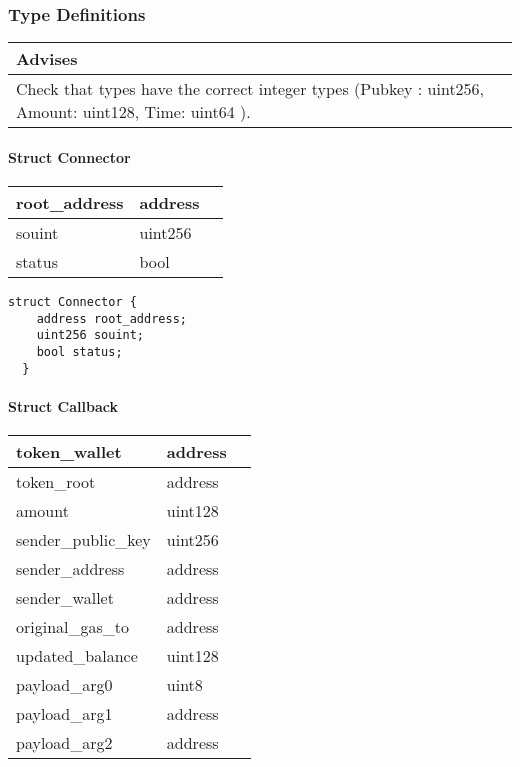 \subsubsection{Type Definitions}


\ifsoldraft
\noindent\begin{tabular}{|p{12cm}|}\hline
\rowcolor{green}Advises
\\\hline
Check that types have the correct integer types (Pubkey : uint256, Amount: uint128, Time: uint64 ).
\\\hline\end{tabular}
\fi

\paragraph{Struct Connector}


\ifsoltables
\noindent\begin{tabular}{|l|l|p{6cm}|}\hline
root\_{}address & address & \\\hline
souint & uint256 & \\\hline
status & bool & \\\hline
\end{tabular}
\fi


\begin{lstlisting}[firstnumber=37]
  struct Connector {
    address root_address;
    uint256 souint;
    bool status;
  }
\end{lstlisting}

\paragraph{Struct Callback}


\ifsoltables
\noindent\begin{tabular}{|l|l|p{6cm}|}\hline
token\_{}wallet & address & \\\hline
token\_{}root & address & \\\hline
amount & uint128 & \\\hline
sender\_{}public\_{}key & uint256 & \\\hline
sender\_{}address & address & \\\hline
sender\_{}wallet & address & \\\hline
original\_{}gas\_{}to & address & \\\hline
updated\_{}balance & uint128 & \\\hline
payload\_{}arg0 & uint8 & \\\hline
payload\_{}arg1 & address & \\\hline
payload\_{}arg2 & address & \\\hline
\end{tabular}
\fi


